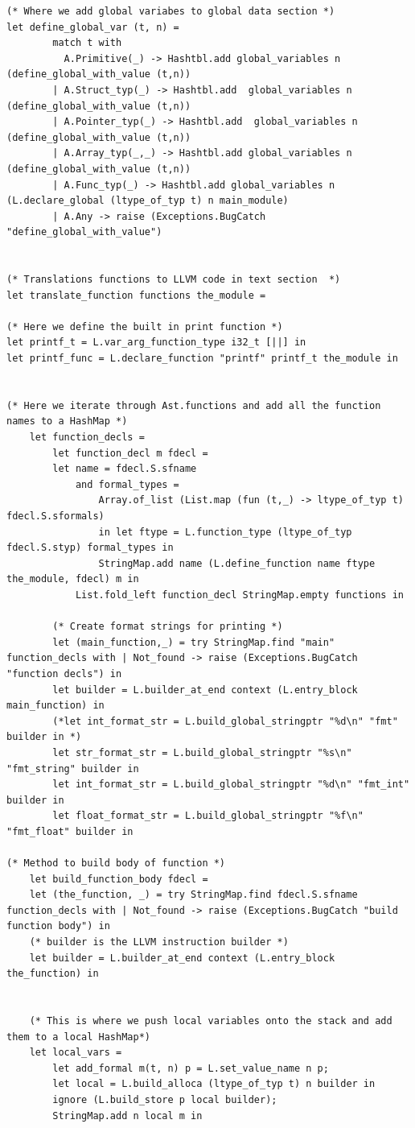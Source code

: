 \documentclass{article}
\begin{document}
\begin{lstlisting}
(* Where we add global variabes to global data section *)
let define_global_var (t, n) =
		match t with
		  A.Primitive(_) -> Hashtbl.add global_variables n (define_global_with_value (t,n))
		| A.Struct_typ(_) -> Hashtbl.add  global_variables n (define_global_with_value (t,n))
		| A.Pointer_typ(_) -> Hashtbl.add  global_variables n (define_global_with_value (t,n))
		| A.Array_typ(_,_) -> Hashtbl.add global_variables n (define_global_with_value (t,n))
		| A.Func_typ(_) -> Hashtbl.add global_variables n (L.declare_global (ltype_of_typ t) n main_module)
		| A.Any -> raise (Exceptions.BugCatch "define_global_with_value")

	
(* Translations functions to LLVM code in text section  *)
let translate_function functions the_module = 

(* Here we define the built in print function *)
let printf_t = L.var_arg_function_type i32_t [||] in
let printf_func = L.declare_function "printf" printf_t the_module in


(* Here we iterate through Ast.functions and add all the function names to a HashMap *)
	let function_decls =
		let function_decl m fdecl =
		let name = fdecl.S.sfname
        	and formal_types =
            	Array.of_list (List.map (fun (t,_) -> ltype_of_typ t) fdecl.S.sformals)
            	in let ftype = L.function_type (ltype_of_typ fdecl.S.styp) formal_types in
             	StringMap.add name (L.define_function name ftype the_module, fdecl) m in
    		List.fold_left function_decl StringMap.empty functions in

		(* Create format strings for printing *)
		let (main_function,_) = try StringMap.find "main" function_decls with | Not_found -> raise (Exceptions.BugCatch "function decls") in
		let builder = L.builder_at_end context (L.entry_block main_function) in
		(*let int_format_str = L.build_global_stringptr "%d\n" "fmt" builder in *)
		let str_format_str = L.build_global_stringptr "%s\n" "fmt_string" builder in
		let int_format_str = L.build_global_stringptr "%d\n" "fmt_int" builder in
		let float_format_str = L.build_global_stringptr "%f\n" "fmt_float" builder in

(* Method to build body of function *)
	let build_function_body fdecl =
	let (the_function, _) = try StringMap.find fdecl.S.sfname function_decls with | Not_found -> raise (Exceptions.BugCatch "build function body") in
	(* builder is the LLVM instruction builder *)
	let builder = L.builder_at_end context (L.entry_block the_function) in

	
	(* This is where we push local variables onto the stack and add them to a local HashMap*)
	let local_vars = 
		let add_formal m(t, n) p = L.set_value_name n p;
		let local = L.build_alloca (ltype_of_typ t) n builder in
		ignore (L.build_store p local builder);
		StringMap.add n local m in


\end{lstlisting}
\end{document}
